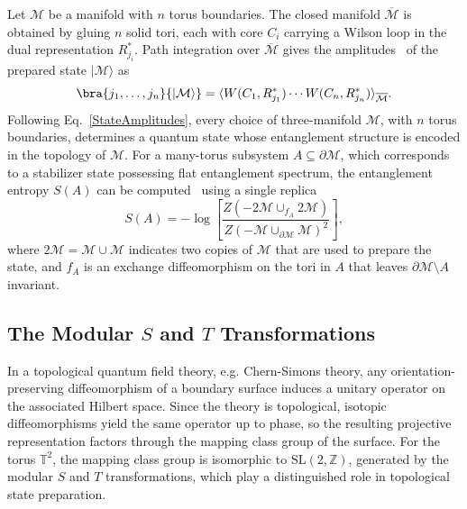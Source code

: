 \documentclass[12pt,a4paper]{article}
\def\ket#1{{|{#1}\rangle}}
\begin{document}
Let $\mathcal{M}$ be a manifold with $n$ torus boundaries. The closed manifold $\overline{\mathcal{M}}$ is obtained by gluing $n$ solid tori, each with core $C_i$ carrying a Wilson loop in the dual representation $R_{j_i}^*$. Path integration over $\overline{\mathcal{M}}$ gives the amplitudes~\cite{Salton:2016qpp} of the prepared state $\ket{\mathcal{M}}$ as
%
\begin{equation}\label{StateAmplitudes}
\bra{j_1, \ldots, j_n}\ket{\mathcal{M}} = \langle W(C_1, R_{j_1}^*) \cdots W(C_n, R_{j_n}^*) \rangle_{\overline{\mathcal{M}}}.
\end{equation}
%
Following Eq.\ \eqref{StateAmplitudes}, every choice of three-manifold $\mathcal{M}$, with $n$ torus boundaries, determines a quantum state whose entanglement structure is encoded in the topology of $\mathcal{M}$. For a many-torus subsystem $A \subseteq \partial\mathcal{M}$, which corresponds to a stabilizer state possessing flat entanglement spectrum, the entanglement entropy $S(A)$ can be computed~\cite{Salton:2016qpp} using a single replica
%
\begin{equation}\label{TopologicalEE}
S(A) = -\log\left[\frac{Z(-2\mathcal{M} \cup_{f_A} 2\mathcal{M})}{Z(-\mathcal{M} \cup_{\partial \mathcal{M}} \mathcal{M})^2}\right],
\end{equation}
%
where $2\mathcal{M} = \mathcal{M} \cup \mathcal{M}$ indicates two copies of $\mathcal{M}$ that are used to prepare the state, and $f_A$ is an exchange diffeomorphism on the tori in $A$ that leaves $\partial\mathcal{M}\setminus A$ invariant.

\subsection{The Modular $S$ and $T$ Transformations}\label{ModularSection}

In a topological quantum field theory, e.g. Chern-Simons theory, any orientation-preserving diffeomorphism of a boundary surface induces a unitary operator on the associated Hilbert space. Since the theory is topological, isotopic diffeomorphisms yield the same operator up to phase, so the resulting projective representation factors through the mapping class group of the surface. For the torus $\mathbb{T}^2$, the mapping class group is isomorphic to $\mathrm{SL}(2,\mathbb{Z})$, generated by the modular $S$ and $T$ transformations, which play a distinguished role in topological state preparation.
\end{document}
